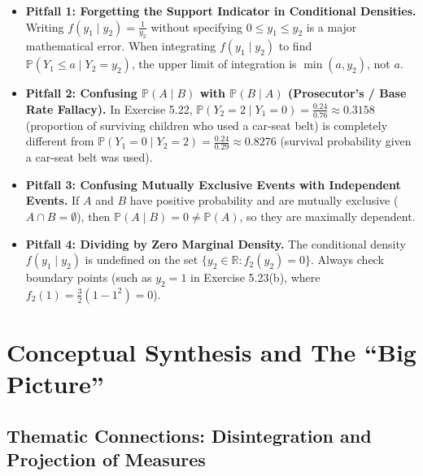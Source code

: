 \documentclass[11pt, letterpaper]{article}
\theoremstyle{definition}
\theoremstyle{remark}
\newcommand{\Prob}{\mathbb{P}}
\begin{document}
\begin{itemize}
    \item \textbf{Pitfall 1: Forgetting the Support Indicator in Conditional Densities.} Writing $f(y_1 \mid y_2) = \frac{1}{y_2}$ without specifying $0 \le y_1 \le y_2$ is a major mathematical error. When integrating $f(y_1 \mid y_2)$ to find $\Prob(Y_1 \le a \mid Y_2 = y_2)$, the upper limit of integration is $\min(a, y_2)$, not $a$.
    \item \textbf{Pitfall 2: Confusing $\Prob(A \mid B)$ with $\Prob(B \mid A)$ (Prosecutor's / Base Rate Fallacy).} In Exercise 5.22, $\Prob(Y_2 = 2 \mid Y_1 = 0) = \frac{0.24}{0.76} \approx 0.3158$ (proportion of surviving children who used a car-seat belt) is completely different from $\Prob(Y_1 = 0 \mid Y_2 = 2) = \frac{0.24}{0.29} \approx 0.8276$ (survival probability given a car-seat belt was used).
    \item \textbf{Pitfall 3: Confusing Mutually Exclusive Events with Independent Events.} If $A$ and $B$ have positive probability and are mutually exclusive ($A \cap B = \emptyset$), then $\Prob(A \mid B) = 0 \neq \Prob(A)$, so they are maximally dependent.
    \item \textbf{Pitfall 4: Dividing by Zero Marginal Density.} The conditional density $f(y_1 \mid y_2)$ is undefined on the set $\{y_2 \in \mathbb{R} : f_2(y_2) = 0\}$. Always check boundary points (such as $y_2 = 1$ in Exercise 5.23(b), where $f_2(1) = \frac{3}{2}(1 - 1^2) = 0$).
\end{itemize}

\newpage
\section{Conceptual Synthesis and The ``Big Picture''}

\subsection{Thematic Connections: Disintegration and Projection of Measures}
\end{document}
